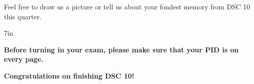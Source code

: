 \documentclass[twoside,12pt]{article}
\begin{document}
\newpage


\noindent Feel free to draw us a picture or tell us about your fondest memory from DSC 10 this
quarter.

\begin{responsebox}{7in}
\end{responsebox}

\noindent \textbf{Before turning in your exam, please make sure that your PID is on every page.}

\bigskip

\noindent \textbf{Congratulations on finishing DSC 10!}
\end{document}
